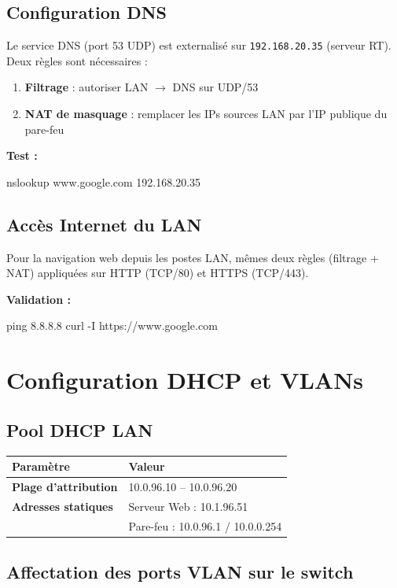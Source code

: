 \documentclass[11pt,a4paper]{article}
\begin{document}
\subsection{Configuration DNS}
Le service DNS (port 53 UDP) est externalisé sur \texttt{192.168.20.35} (serveur RT). Deux règles sont nécessaires :

\begin{enumerate}
  \item \textbf{Filtrage} : autoriser LAN $\rightarrow$ DNS sur UDP/53
  \item \textbf{NAT de masquage} : remplacer les IPs sources LAN par l'IP publique du pare-feu
\end{enumerate}

\textbf{Test :}
\begin{shellbox}
nslookup www.google.com 192.168.20.35
\end{shellbox}

\subsection{Accès Internet du LAN}
Pour la navigation web depuis les postes LAN, mêmes deux règles (filtrage + NAT) appliquées sur HTTP (TCP/80) et HTTPS (TCP/443).

\textbf{Validation :}
\begin{shellbox}
ping 8.8.8.8
curl -I https://www.google.com
\end{shellbox}

\section{Configuration DHCP et VLANs}

\subsection{Pool DHCP LAN}

\begin{tabularx}{\linewidth}{@{}>{\bfseries}l X@{}}
\toprule
\rowcolor{light} Paramètre & Valeur \\ \midrule
Plage d'attribution     & 10.0.96.10 -- 10.0.96.20 \\
Adresses statiques      & Serveur Web : 10.1.96.51 \\
                        & Pare-feu : 10.0.96.1 / 10.0.0.254 \\
\bottomrule
\end{tabularx}

\subsection{Affectation des ports VLAN sur le switch}
\end{document}
